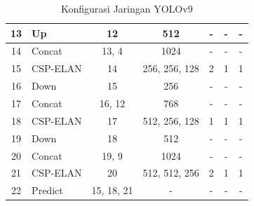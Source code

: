 \begin{table}[H]
\begin{tabular}{|c|l|c|c|c|c|c|}
    13             & Up              & 12             & 512                & -              & -             & -               \\ \hline
    14             & Concat          & 13, 4          & 1024               & -              & -             & -               \\ \hline
    15             & CSP-ELAN        & 14             & 256, 256, 128      & 2              & 1             & 1               \\ \hline
    16             & Down            & 15             & 256                & -              & -             & -               \\ \hline
    17             & Concat          & 16, 12         & 768                & -              & -             & -               \\ \hline
    18             & CSP-ELAN        & 17             & 512, 256, 128      & 1              & 1             & 1               \\ \hline
    19             & Down            & 18             & 512                & -              & -             & -               \\ \hline
    20             & Concat          & 19, 9          & 1024               & -              & -             & -               \\ \hline
    21             & CSP-ELAN        & 20             & 512, 512, 256      & 2              & 1             & 1               \\ \hline
    22             & Predict         & 15, 18, 21     & -                  & -              & -             & -               \\ \hline
  \end{tabular}
  \caption{Konfigurasi Jaringan YOLOv9}
  \label{tab:networkyolov9}
\end{table}

